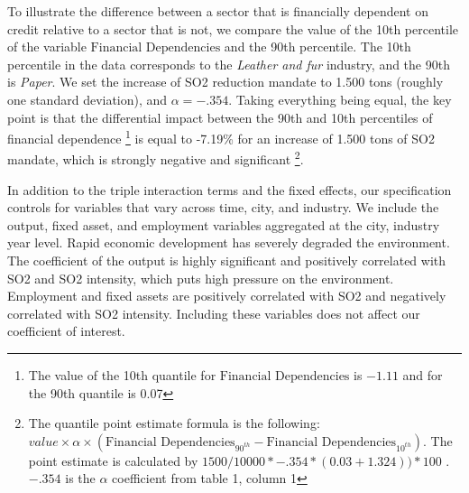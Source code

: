 \documentclass[12pt]{article}
\begin{document}
To illustrate the difference between a sector that is financially dependent on credit relative to a sector that is not, we compare the value of the 10th percentile of the variable $\text{Financial Dependencies}$ and the 90th percentile. The 10th percentile in the data corresponds to the \textit{Leather and fur} industry, and the 90th is \textit{Paper}. We set the increase of SO2 reduction mandate to 1.500 tons (roughly one standard deviation), and $\alpha= -.354$. Taking everything being equal, the key point is that the differential impact between the 90th and 10th percentiles of financial dependence \footnote{The value of the 10th quantile for  $\text{Financial Dependencies}$ is $-1.11$ and for the 90th quantile is 0.07} is equal to -7.19\% for an increase of 1.500 tons of SO2 mandate, which is strongly negative and significant \footnote{The quantile point estimate formula is the following: $value \times \alpha \times (\text{Financial Dependencies}_{90^{th}} - \text{Financial Dependencies}_{10^{th}})$. The point estimate is calculated by $1500/10000 * -.354 * (0.03 + 1.324 )) * 100$ . $-.354$ is the $\alpha$ coefficient from table 1, column 1}.

In addition to the triple interaction terms and the fixed effects, our specification controls for variables that vary across time, city, and industry. We include the output, fixed asset, and employment variables aggregated at the city, industry year level. Rapid economic development has severely degraded the environment. The coefficient of the output is highly significant and positively correlated with SO2 and SO2 intensity, which puts high pressure on the environment. Employment and fixed assets are positively correlated with SO2 and negatively correlated with SO2 intensity. Including these variables does not affect our coefficient of interest.
\end{document}
